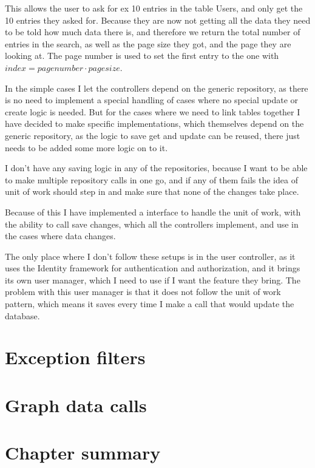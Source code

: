 This allows the user to ask for ex 10 entries in the table Users, and only get the 10 entries they asked for. Because they are now not getting all the data they need to be told how much data there is, and therefore we return the total number of entries in the search, as well as the page size they got, and the page they are looking at. The page number is used to set the first entry to the one with $index = page number \cdot page size$.

In the simple cases I let the controllers depend on the generic repository, as there is no need to implement a special handling of cases where no special update or create logic is needed. But for the cases where we need to link tables together I have decided to make specific implementations, which themselves depend on the generic repository, as the logic to save get and update can be reused, there just needs to be added some more logic on to it.

I don't have any saving logic in any of the repositories, because I want to be able to make multiple repository calls in one go, and if any of them fails the idea of unit of work should step in and make sure that none of the changes take place.

Because of this I have implemented a interface to handle the unit of work, with the ability to call save changes, which all the controllers implement, and use in the cases where data changes.

The only place where I don't follow these setups is in the user controller, as it uses the Identity framework for authentication and authorization, and it brings its own user manager, which I need to use if I want the feature they bring. The problem with this user manager is that it does not follow the unit of work pattern, which means it saves every time I make a call that would update the database.

\section{Exception filters}
\label{sec:Exception filters}


\section{Graph data calls}
\label{sec:Graph data calls}


\section{Chapter summary}
